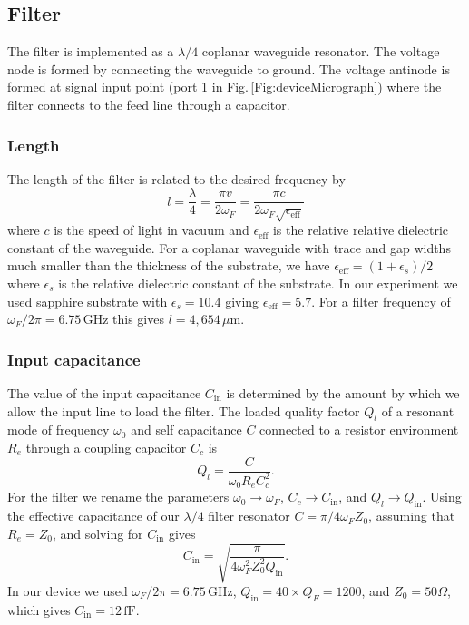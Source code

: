 \subsection{Filter}

The filter is implemented as a $\lambda/4$ coplanar waveguide resonator.
The voltage node is formed by connecting the waveguide to ground.
The voltage antinode is formed at signal input point (port 1 in Fig.\,\ref{Fig:deviceMicrograph}) where the filter connects to the feed line through a capacitor.

\subsubsection{Length}

The length of the filter is related to the desired frequency by \begin{equation}
l = \frac{\lambda}{4} = \frac{\pi v}{2 \omega_F} = \frac{\pi c}{2 \omega_F \sqrt{\epsilon_{\text{eff}}}} \end{equation}
where $c$ is the speed of light in vacuum and $\epsilon_{\text{eff}}$ is the relative relative dielectric constant of the waveguide.
For a coplanar waveguide with trace and gap widths much smaller than the thickness of the substrate, we have $\epsilon_{\text{eff}} = (1 + \epsilon_s) / 2$ where $\epsilon_s$ is the relative dielectric constant of the substrate.
In our experiment we used sapphire substrate with $\epsilon_s = 10.4$ giving $\epsilon_{\text{eff}} = 5.7$.
For a filter frequency of $\omega_F/2\pi = 6.75\,\text{GHz}$ this gives $l = 4,654\,\mu\text{m}$.

\subsubsection{Input capacitance}

The value of the input capacitance $C_{\text{in}}$ is determined by the amount by which we allow the input line to load the filter.
The loaded quality factor $Q_l$ of a resonant mode of frequency $\omega_0$ and self capacitance $C$ connected to a resistor environment $R_e$ through a coupling capacitor $C_c$ is \begin{equation}
Q_l = \frac{C}{\omega_0 R_e C_c^2}. \end{equation}
For the filter we rename the parameters $\omega_0 \rightarrow \omega_F$, $C_c \rightarrow C_{\text{in}}$, and $Q_l \rightarrow Q_{\text{in}}$. Using the effective capacitance of our $\lambda/4$ filter resonator $C = \pi / 4 \omega_F Z_0$, assuming that $R_e=Z_0$, and solving for $C_{\text{in}}$ gives \begin{equation}
C_{\text{in}} = \sqrt{\frac{\pi}{4 \omega_F^2 Z_0^2 Q_{\text{in}}}}. \end{equation}
In our device we used $\omega_F / 2\pi = 6.75\,\text{GHz}$, $Q_{\text{in}} = 40 \times Q_F = 1200$, and $Z_0 = 50 \Omega$, which gives $C_{\text{in}} = 12 \, \text{fF}$.

